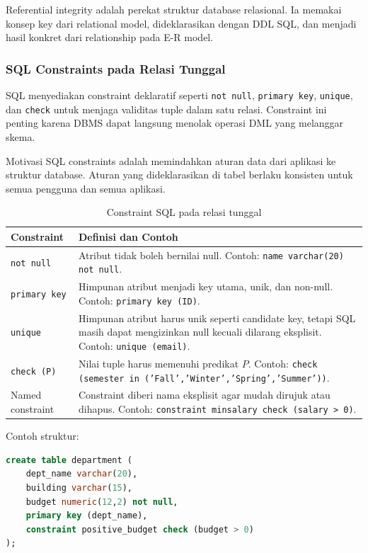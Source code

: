 Referential integrity adalah perekat struktur database relasional. Ia memakai konsep key dari relational model, dideklarasikan dengan DDL SQL, dan menjadi hasil konkret dari relationship pada E-R model.

\subsubsection{SQL Constraints pada Relasi Tunggal}

\begin{jawab}
SQL menyediakan constraint deklaratif seperti \texttt{not null}, \texttt{primary key}, \texttt{unique}, dan \texttt{check} untuk menjaga validitas tuple dalam satu relasi. Constraint ini penting karena DBMS dapat langsung menolak operasi DML yang melanggar skema.
\end{jawab}

Motivasi SQL constraints adalah memindahkan aturan data dari aplikasi ke struktur database. Aturan yang dideklarasikan di tabel berlaku konsisten untuk semua pengguna dan semua aplikasi.

\begin{table}[H]
\centering
\begin{tabularx}{\textwidth}{|L{0.22\textwidth}|X|}
\hline
\textbf{Constraint} & \textbf{Definisi dan Contoh} \\
\hline
\texttt{not null} & Atribut tidak boleh bernilai null. Contoh: \texttt{name varchar(20) not null}. \\
\hline
\texttt{primary key} & Himpunan atribut menjadi key utama, unik, dan non-null. Contoh: \texttt{primary key (ID)}. \\
\hline
\texttt{unique} & Himpunan atribut harus unik seperti candidate key, tetapi SQL masih dapat mengizinkan null kecuali dilarang eksplisit. Contoh: \texttt{unique (email)}. \\
\hline
\texttt{check (P)} & Nilai tuple harus memenuhi predikat \(P\). Contoh: \texttt{check (semester in ('Fall','Winter','Spring','Summer'))}. \\
\hline
Named constraint & Constraint diberi nama eksplisit agar mudah dirujuk atau dihapus. Contoh: \texttt{constraint minsalary check (salary > 0)}. \\
\hline
\end{tabularx}
\caption{Constraint SQL pada relasi tunggal}
\label{tab:sql-single-relation-constraints}
\end{table}

Contoh struktur:
\begin{lstlisting}[language=SQL, caption={Contoh constraint relasi tunggal}, label={lst:single-relation-constraints}]
create table department (
    dept_name varchar(20),
    building varchar(15),
    budget numeric(12,2) not null,
    primary key (dept_name),
    constraint positive_budget check (budget > 0)
);
\end{lstlisting}

